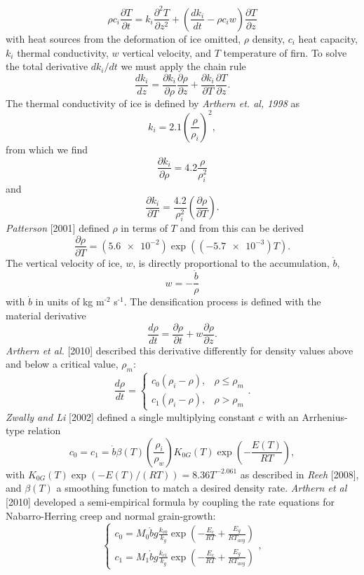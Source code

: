 \documentclass{article}%
\newcommand{\sups}[1]{\ensuremath{^{\textrm{#1}}}}
\begin{document}
  $$
  \rho c_i \frac{\partial T}{\partial t} = 
    k_i \frac{\partial^2 T}{\partial z^2} +
    \left( \frac{dk_i}{dt} - \rho c_i w \right) \frac{\partial T}{\partial z}
  $$
with heat sources from the deformation of ice omitted, $\rho$ density, $c_i$ heat capacity, $k_i$ thermal conductivity, $w$ vertical velocity, and $T$ temperature of firn.  To solve the total derivative $dk_i/dt$ we must apply the chain rule
  $$
  \frac{dk_i}{dz} = 
  \frac{\partial k_i}{\partial \rho} \frac{\partial \rho}{\partial z} + 
  \frac{\partial k_i}{\partial T} \frac{\partial T}{\partial z}.
  $$
The thermal conductivity of ice is defined by \emph{Arthern et. al, 1998} as
  $$k_i = 2.1 \left(\frac{\rho}{\rho_i}\right)^2,$$
from which we find
  $$
  \frac{\partial k_i}{\partial \rho} = 
    4.2 \frac{\rho}{\rho_i^2}
  $$
and
  $$
  \frac{\partial k_i}{\partial T} = 
    \frac{4.2}{\rho_i^2} \left( \frac{\partial \rho}{\partial T} \right).
  $$
\emph{Patterson} [2001] defined $\rho$ in terms of $T$ and from this can be derived
  $$
  \frac{\partial \rho}{\partial T} = 
    (\SI{5.6e-2}) \exp ((\SI{-5.7e-3})T).
  $$
The vertical velocity of ice, $w$, is directly proportional to the accumulation, $\dot{b}$,
  $$
  w = -\frac{\dot{b}}{\rho}
  $$
with $\dot{b}$ in units of kg m\sups{-2} s\sups{-1}.  The densification process is defined with the material derivative
  $$\frac{d \rho}{dt} = \frac{\partial \rho}{\partial t} + 
    w\frac{\partial \rho}{\partial z}.$$
\emph{Arthern et al.} [2010] described this derivative differently for density values above and below a critical value, $\rho_m$:  
  $$
  \frac{d \rho}{dt} = 
  \begin{cases}
   c_0(\rho_i - \rho), &\rho \leq \rho_m\\
   c_1(\rho_i - \rho), &\rho > \rho_m
  \end{cases}.$$
\emph{Zwally and Li} [2002] defined a single multiplying constant $c$ with an Arrhenius-type relation
  $$
  c_0 = c_1 = 
  \dot{b} \beta(T)\left(\frac{\rho_i}{\rho_w}\right)
  K_{0G}(T)\exp \left( -\frac{E(T)}{RT} \right),
  $$
with $K_{0G}(T) \exp(-E(T)/(RT)) = 8.36T^{-2.061}$ as described in \emph{Reeh} [2008], and $\beta(T)$ a smoothing function to match a desired density rate.  \emph{Arthern et al} [2010] developed a semi-empirical formula by coupling the rate equations for Nabarro-Herring creep and normal grain-growth: 
  $$
  \begin{cases}
    c_0 = M_0 \dot{b}g\frac{k_{c0}}{k_g}\exp\left(-\frac{E_c}{RT} + 
          \frac{E_g}{RT_{avg}}\right)\\
    c_1 = M_1 \dot{b}g\frac{k_{c1}}{k_g}\exp\left(-\frac{E_c}{RT} + 
          \frac{E_g}{RT_{avg}}\right)
  \end{cases},
  $$
\end{document}
